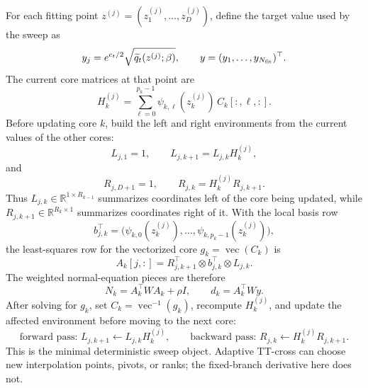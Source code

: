 \documentclass[11pt]{article}
\numberwithin{equation}{section}
\newcommand{\R}{\mathbb R}
\newcommand{\vecop}{\operatorname{vec}}
\begin{document}
For each fitting point \(z^{(j)}=(z^{(j)}_1,\ldots,z^{(j)}_D)\), define the
target value used by the sweep as
\begin{equation}
    y_j
    =
    e^{c_t/2}\sqrt{\widetilde q_t(z^{(j)};\beta)},
    \qquad
    y=(y_1,\ldots,y_{N_{\rm fit}})^\top.
    \label{eq:p24-p23-sweep1a}
\end{equation}
The current core matrices at that point are
\begin{equation}
    H_k^{(j)}
    =
    \sum_{\ell=0}^{p_k-1}
    \psi_{k,\ell}(z_k^{(j)})\,C_k[:,\ell,:].
    \label{eq:p24-p23-sweep1b}
\end{equation}
Before updating core \(k\), build the left and right environments from the
current values of the other cores:
\begin{equation}
    L_{j,1}=1,\qquad
    L_{j,k+1}=L_{j,k}H_k^{(j)},
    \label{eq:p24-p23-sweep1c}
\end{equation}
and
\begin{equation}
    R_{j,D+1}=1,\qquad
    R_{j,k}=H_k^{(j)}R_{j,k+1}.
    \label{eq:p24-p23-sweep1d}
\end{equation}
Thus \(L_{j,k}\in\R^{1\times R_{k-1}}\) summarizes coordinates left of the
core being updated, while \(R_{j,k+1}\in\R^{R_k\times1}\) summarizes
coordinates right of it.  With the local basis row
\begin{equation}
    b_{j,k}^\top
    =
    \bigl(\psi_{k,0}(z_k^{(j)}),\ldots,
    \psi_{k,p_k-1}(z_k^{(j)})\bigr),
    \label{eq:p24-p23-sweep1e}
\end{equation}
the least-squares row for the vectorized core \(g_k=\vecop(C_k)\) is
\begin{equation}
    A_k[j,:]
    =
    R_{j,k+1}^{\top}\otimes b_{j,k}^\top\otimes L_{j,k}.
    \label{eq:p24-p23-sweep1f}
\end{equation}
The weighted normal-equation pieces are therefore
\begin{equation}
    N_k=A_k^\top W A_k+\rho I,
    \qquad
    d_k=A_k^\top W y.
    \label{eq:p24-p23-sweep1g}
\end{equation}
After solving for \(g_k\), set \(C_k=\vecop^{-1}(g_k)\), recompute
\(H_k^{(j)}\), and update the affected environment before moving to the next
core:
\begin{equation}
    \text{forward pass: }L_{j,k+1}\leftarrow L_{j,k}H_k^{(j)},
    \qquad
    \text{backward pass: }R_{j,k}\leftarrow H_k^{(j)}R_{j,k+1}.
    \label{eq:p24-p23-sweep1h}
\end{equation}
This is the minimal deterministic sweep object.  Adaptive TT-cross can choose
new interpolation points, pivots, or ranks; the fixed-branch derivative here
does not.
\end{document}
